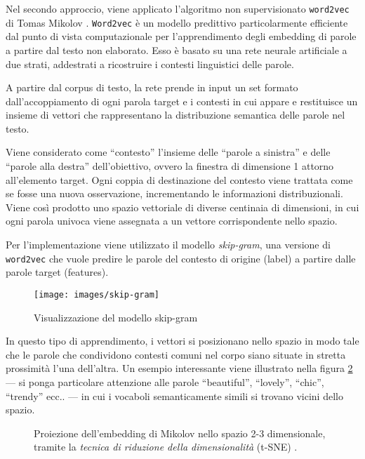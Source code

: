 Nel secondo approccio, viene applicato l'algoritmo non supervisionato \texttt{word2vec} di Tomas Mikolov  \cite{mikolov2013efficient}. 
\texttt{Word2vec} è un modello predittivo particolarmente efficiente dal punto di vista computazionale per l'apprendimento degli embedding di parole a partire dal testo non elaborato.
Esso è basato su una rete neurale artificiale a due strati, addestrati a ricostruire i contesti linguistici delle parole. 

A partire dal corpus di testo, la rete prende in input un set formato dall'accoppiamento di ogni parola target e i contesti in cui appare e restituisce un insieme di vettori che rappresentano la distribuzione semantica delle parole nel testo. 

Viene considerato come ``contesto'' l'insieme delle ``parole a sinistra'' e delle ``parole alla destra'' dell'obiettivo, ovvero la finestra di dimensione 1 attorno all'elemento target. Ogni coppia di destinazione del contesto viene trattata come se fosse una nuova osservazione, incrementando le informazioni distribuzionali. Viene così prodotto uno spazio vettoriale di diverse centinaia di dimensioni, in cui ogni parola univoca viene assegnata a un vettore corrispondente nello spazio.

Per l'implementazione viene utilizzato il modello \emph{skip-gram}, una versione di \texttt{word2vec} che vuole predire le parole del contesto di origine (label) a partire dalle parole target (features).

\begin{figure}[H]
	\centering
	{\texttt{[image: images/skip-gram]}} 
	\caption{Visualizzazione del modello skip-gram}
	\label{fig:mikolov}
\end{figure}

In questo tipo di apprendimento, i vettori si posizionano nello spazio in modo tale che le parole che condividono contesti comuni nel corpo siano situate in stretta prossimità l'una dell'altra. Un esempio interessante viene illustrato nella figura \ref{fig:embedding1} --- si ponga particolare attenzione alle parole ``beautiful'', ``lovely'', ``chic'', ``trendy'' ecc.. --- in cui i vocaboli semanticamente simili si trovano vicini dello spazio.

\begin{figure}[H]
	\centering
	\hspace{10mm}
	
	\caption{Proiezione dell'embedding di Mikolov nello spazio 2-3 dimensionale, tramite la \emph{tecnica di riduzione della dimensionalità} (t-SNE) \cite{maaten2008visualizing}.}
	\label{fig:embedding1}
\end{figure}

